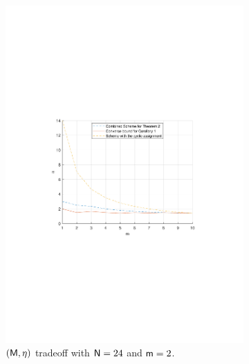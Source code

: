\documentclass[conference,letterpaper]{IEEEtran}
\begin{document}
\begin{figure}[ht] 
    \centering
    \begin{subfigure}[t]{0.5\textwidth}
        \centering
        \includegraphics[scale=0.5]{M varies.pdf}
        \caption{\small $({\sf M},\eta)$ tradeoff with ${\sf N}=24$ and ${\sf m}=2$.}
        \label{fig:numerical 1a}
    \end{subfigure}\\
    \begin{subfigure}[t]{0.5\textwidth}
        \centering

\end{subfigure}
\end{figure}
\end{document}
